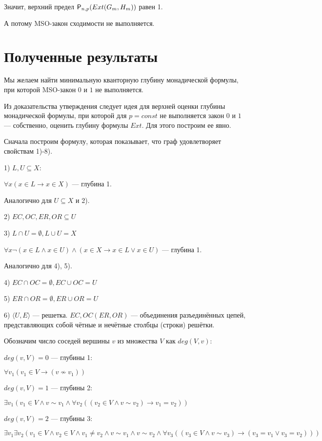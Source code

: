 \documentclass{article}
\begin{document}
Значит, верхний предел ${\sf P}_{n, p} (Ext(G_m, H_m))$ равен 1.

А потому MSO-закон сходимости не выполняется.

\section{Полученные результаты}

Мы желаем найти минимальную кванторную глубину монадической формулы, при которой MSO-закон $0$ и $1$ не выполняется.

Из доказательства утверждения следует идея для верхней оценки глубины монадической формулы, при которой для $p = const$ не выполняется закон $0$ и $1$ --- собственно, оценить глубину формулы $Ext$. Для этого построим ее явно.

Сначала построим формулу, которая показывает, что граф удовлетворяет свойствам 1)-8).

1) $L, U \subseteq X$:

$\forall x (x \in L \rightarrow x \in X)$  --- глубина 1.

Аналогично для $U \subseteq X$ и 2).

2) $EC, OC, ER, OR \subseteq U$

3) $L \cap U = \emptyset, L \cup U = X$

$\forall x \neg (x \in L \land x \in U) \land (x \in X \rightarrow x \in L \lor x \in U)$  --- глубина 1.

Аналогично для 4), 5).

4) $EC \cap OC = \emptyset, EC \cup OC = U$

5) $ER \cap OR = \emptyset, ER \cup OR = U$

6) $\langle U, E \rangle$ --- решетка. $EC, OC (ER, OR)$ --- объединения разъединённых цепей, представляющих собой чётные и нечётные столбцы (строки) решётки.

Обозначим число соседей вершины $v$ из множества $V$ как $deg (V, v)$:

$deg (v, V) = 0$ --- глубины 1:

$\forall v_1 (v_1 \in V \rightarrow (v \nsim v_1))$

$deg (v, V) = 1$ --- глубины 2:

$\exists v_1 (v_1 \in V \land v \sim v_1 \land \forall v_2 ((v_2 \in V \land v \sim v_2) \rightarrow
v_1 = v_2)) $

$deg (v, V) = 2$ --- глубины 3:

$\exists v_1 \exists v_2 (v_1 \in V \land v_2 \in V \land v_1 \neq v_2 \land v \sim v_1 \land v
\sim v_2 \land \forall v_3((v_3 \in V \land v \sim v_3) \rightarrow (v_3 = v_1 \lor v_3 = v_2)))$
\end{document}
